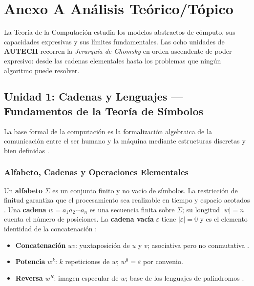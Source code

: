 \section*{Anexo A \textemdash{} Análisis Teórico/Tópico}

La Teoría de la Computación estudia los modelos abstractos de cómputo, sus capacidades expresivas
y sus límites fundamentales. Las ocho unidades de \textbf{AUTECH} recorren la \emph{Jerarquía de
Chomsky} en orden ascendente de poder expresivo: desde las cadenas elementales hasta los problemas
que ningún algoritmo puede resolver.

\subsection*{Unidad 1: Cadenas y Lenguajes — Fundamentos de la Teoría de Símbolos}

La base formal de la computación es la formalización algebraica de la comunicación entre el ser
humano y la máquina mediante estructuras discretas y bien definidas \cite{hopcroft2007es}.

\subsubsection*{Alfabeto, Cadenas y Operaciones Elementales}

Un \textbf{alfabeto} $\Sigma$ es un conjunto finito y no vacío de símbolos. La restricción de
finitud garantiza que el procesamiento sea realizable en tiempo y espacio acotados \cite{kelley2001}.
Una \textbf{cadena} $w = a_1 a_2 \cdots a_n$ es una secuencia finita sobre $\Sigma$; su longitud
$|w| = n$ cuenta el número de posiciones. La \textbf{cadena vacía} $\varepsilon$ tiene
$|\varepsilon| = 0$ y es el elemento identidad de la concatenación \cite{eugene2008}:

\begin{itemize}
  \item \textbf{Concatenación} $uv$: yuxtaposición de $u$ y $v$; asociativa pero no conmutativa
        \cite{sipser2012}.
  \item \textbf{Potencia} $w^k$: $k$ repeticiones de $w$; $w^0 = \varepsilon$ por convenio.
  \item \textbf{Reversa} $w^R$: imagen especular de $w$; base de los lenguajes de palíndromos
        \cite{decastro2004}.
\end{itemize}

